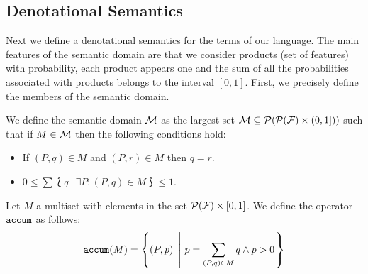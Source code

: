 \subsection{Denotational Semantics}
\label{sec:stat:den}

Next we define a denotational semantics for the terms of our language. The main features of the semantic domain are that we consider products (set of features) with probability,
each product appears one and the sum of all the probabilities associated with products belongs to the interval $[0,1]$. First, we precisely define the members of the semantic domain.



\bdfn\label{def:den:pr}
We define the semantic domain ${\cal M}$ as the largest set ${\cal M}\subseteq{\cal P}({\cal P}({\cal F})\times
  (0,1]))$ such that if $M\in{\cal M}$ then the following
  conditions hold:
  \begin{itemize}
  \item If $(P,q)\in M$ and $(P,r)\in M$ then $q=r$.
  \item $0\leq \sum \lbag q \ | \ \exists P: (P,q)\in M\rbag \leq 1$.
  \end{itemize}


Let $M$ a multiset  with elements in the set ${\cal P}({\cal F})\times [0,1]$.
We define the operator $\mathtt{accum}$ as follows:
  $$\accum(M) = \left\{(P,p)\ \left| \ p=\sum_{(P,q)\in M}q \wedge p>0\right. \right\}$$
\edfn

